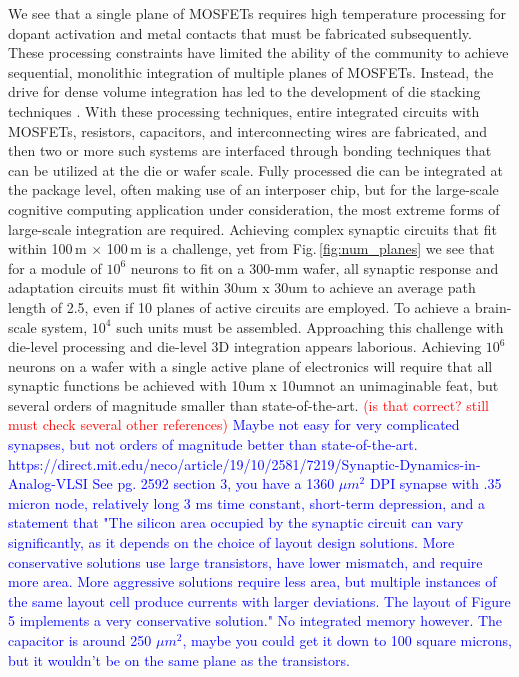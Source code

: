 \documentclass[twocolumn]{article}
\begin{document}
We see that a single plane of MOSFETs requires high temperature processing for dopant activation and metal contacts that must be fabricated subsequently. These processing constraints have limited the ability of the community to achieve sequential, monolithic integration of multiple planes of MOSFETs. Instead, the drive for dense volume integration has led to the development of die stacking techniques \cite{elfe2016}. With these processing techniques, entire integrated circuits with MOSFETs, resistors, capacitors, and interconnecting wires are fabricated, and then two or more such systems are interfaced through bonding techniques that can be utilized at the die or wafer scale. Fully processed die can be integrated at the package level, often making use of an interposer chip, but for the large-scale cognitive computing application under consideration, the most extreme forms of large-scale integration are required. Achieving complex synaptic circuits that fit within 100\,\textmu m $\times$ 100\,\textmu m is a challenge, yet from Fig.\,\ref{fig:num_planes} we see that for a module of $10^6$ neurons to fit on a 300-mm wafer, all synaptic response and adaptation circuits must fit within 30um x 30um to achieve an average path length of 2.5, even if 10 planes of active circuits are employed. To achieve a brain-scale system, $10^4$ such units must be assembled. Approaching this challenge with die-level processing and die-level 3D integration appears laborious. Achieving $10^6$ neurons on a wafer with a single active plane of electronics will require that all synaptic functions be achieved with 10um x 10um\textemdash not an unimaginable feat, but several orders of magnitude smaller than state-of-the-art. \textcolor{red}{(is that correct? still must check several other references)} \textcolor{blue}{Maybe not easy for very complicated synapses, but not orders of magnitude better than state-of-the-art.  https://direct.mit.edu/neco/article/19/10/2581/7219/Synaptic-Dynamics-in-Analog-VLSI See pg. 2592 section 3, you have a 1360 $\mu m^2$ DPI synapse with .35 micron node, relatively long 3 ms time constant, short-term depression, and a statement that "The silicon area occupied by the synaptic circuit can vary significantly, as it depends on the choice of layout design solutions. More conservative solutions use large transistors, have lower mismatch, and require more area. More aggressive solutions require less area, but multiple instances of the same layout cell produce currents with larger deviations. The layout of Figure 5 implements a very conservative solution." No integrated memory however. The capacitor is around 250 $\mu m^2$, maybe you could get it down to 100 square microns, but it wouldn't be on the same plane as the transistors.}
\end{document}
